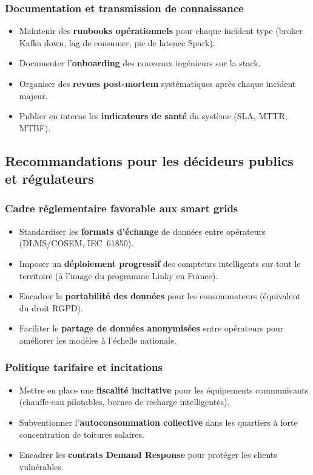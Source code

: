 \documentclass[11pt,a4paper]{article}
\begin{document}
\subsubsection{Documentation et transmission de connaissance}
\begin{itemize}
  \item Maintenir des \textbf{runbooks opérationnels} pour chaque incident type (broker Kafka down, lag de consumer, pic de latence Spark).
  \item Documenter l'\textbf{onboarding} des nouveaux ingénieurs sur la stack.
  \item Organiser des \textbf{revues post-mortem} systématiques après chaque incident majeur.
  \item Publier en interne les \textbf{indicateurs de santé} du système (SLA, MTTR, MTBF).
\end{itemize}

\subsection{Recommandations pour les décideurs publics et régulateurs}

\subsubsection{Cadre réglementaire favorable aux smart grids}
\begin{itemize}
  \item Standardiser les \textbf{formats d'échange} de données entre opérateurs (DLMS/COSEM, IEC~61850).
  \item Imposer un \textbf{déploiement progressif} des compteurs intelligents sur tout le territoire (à l'image du programme Linky en France).
  \item Encadrer la \textbf{portabilité des données} pour les consommateurs (équivalent du droit RGPD).
  \item Faciliter le \textbf{partage de données anonymisées} entre opérateurs pour améliorer les modèles à l'échelle nationale.
\end{itemize}

\subsubsection{Politique tarifaire et incitations}
\begin{itemize}
  \item Mettre en place une \textbf{fiscalité incitative} pour les équipements communicants (chauffe-eau pilotables, bornes de recharge intelligentes).
  \item Subventionner l'\textbf{autoconsommation collective} dans les quartiers à forte concentration de toitures solaires.
  \item Encadrer les \textbf{contrats Demand Response} pour protéger les clients vulnérables.
\end{itemize}
\end{document}
